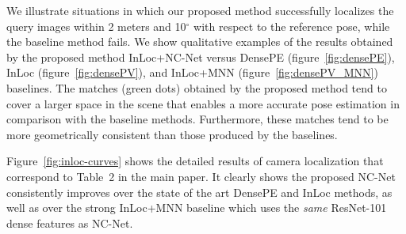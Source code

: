 \documentclass{article}
\begin{document}
We illustrate situations in which our proposed method successfully localizes the query images within 2 meters and 10$^\circ$ with respect to the reference pose, while the baseline method fails. We show qualitative examples of the results obtained by the proposed method InLoc+NC-Net versus
DensePE (figure~\ref{fig:densePE}), InLoc (figure~\ref{fig:densePV}),
and InLoc+MNN (figure~\ref{fig:densePV_MNN}) baselines.
The matches (green dots) obtained by the proposed method tend to cover a larger space in the scene that enables a more accurate pose estimation in comparison with the baseline methods. Furthermore, these matches tend to be more geometrically consistent than those produced by the baselines.

Figure~\ref{fig:inloc-curves} shows the detailed results of camera localization that correspond to Table~2 in the main paper. It clearly shows the proposed NC-Net consistently improves over the state of the art DensePE and InLoc methods, as well as over the strong InLoc+MNN baseline which uses the \emph{same} ResNet-101 dense features as NC-Net.
\end{document}
